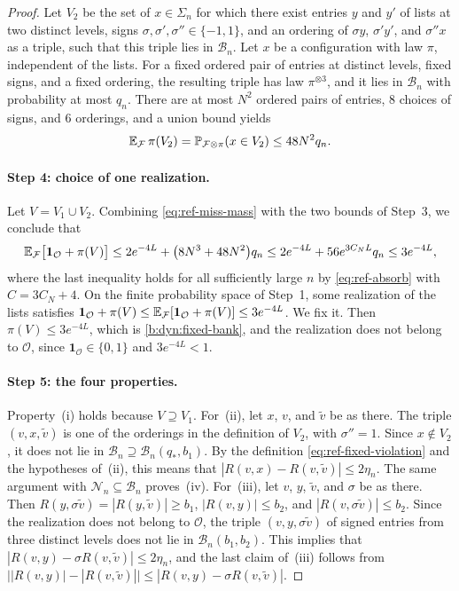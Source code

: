 \begin{proof}
Let $V_2$ be the set of $x\in\Sigma_n$ for which there exist entries
$y$ and $y'$ of lists at two distinct levels, signs $\sigma,\sigma',
\sigma''\in\{-1,1\}$, and an ordering of $\sigma y$, $\sigma'y'$, and
$\sigma''x$ as a triple, such that this triple lies in $\mathcal B_n$. Let
$x$ be a configuration with law $\pi$, independent of the lists. For a fixed
ordered pair of entries at distinct levels, fixed signs, and a fixed
ordering, the resulting triple has law $\pi^{\otimes3}$, and it lies in
$\mathcal B_n$ with probability at most $q_n$. There are at most $N^2$
ordered pairs of entries, $8$ choices of signs, and $6$ orderings, and a
union bound yields
\[
 \mathbb E_{\mathcal F}\,\pi(V_2)
 =\mathbb P_{\mathcal F\otimes\pi}(x\in V_2)\le48N^2q_n .
\]

\paragraph{Step 4: choice of one realization.}
Let $V=V_1\cup V_2$. Combining \eqref{eq:ref-miss-mass} with
the two bounds of Step~3, we conclude that
\[
 \mathbb E_{\mathcal F}\bigl[\mathbf 1_{\mathcal O}+\pi(V)\bigr]
 \le2e^{-4L}+\bigl(8N^3+48N^2\bigr)q_n
 \le2e^{-4L}+56e^{3C_NL}q_n\le3e^{-4L},
\]
where the last inequality holds for all sufficiently large $n$ by
\eqref{eq:ref-absorb} with $C=3C_N+4$. On the finite probability space of
Step~1, some realization of the lists satisfies
$\mathbf 1_{\mathcal O}+\pi(V)\le\mathbb E_{\mathcal F}[\mathbf 1_{\mathcal O}+\pi(V)]\le3e^{-4L}$.
We fix it. Then $\pi(V)\le3e^{-4L}$, which is \eqref{b:dyn:fixed-bank}, and
the realization does not belong to $\mathcal O$, since
$\mathbf 1_{\mathcal O}\in\{0,1\}$ and $3e^{-4L}<1$.

\paragraph{Step 5: the four properties.}
Property~(i) holds because $V\supseteq V_1$. For~(ii), let $x$, $v$,
and ${\widetilde v}$ be as there. The triple $(v,x,{\widetilde v})$ is one of the orderings in the
definition of $V_2$, with $\sigma''=1$. Since $x\notin V_2$,
it does not lie in $\mathcal B_n\supseteq\mathcal B_n(q_*,b_1)$. By the
definition \eqref{eq:ref-fixed-violation} and the hypotheses of~(ii), this
means that $|R(v,x)-R(v,{\widetilde v})|\le2\eta_n$. The same argument with
$\mathcal N_n\subseteq\mathcal B_n$ proves~(iv). For~(iii), let $v$, $y$,
${\widetilde v}$, and $\sigma$ be as there. Then $R(y,\sigma {\widetilde v})=|R(y,{\widetilde v})|\ge b_1$,
$|R(v,y)|\le b_2$, and $|R(v,\sigma {\widetilde v})|\le b_2$. Since the realization does not belong to $\mathcal O$, the triple
$(v,y,\sigma {\widetilde v})$ of signed entries from three distinct levels does not lie in
$\mathcal B_n(b_1,b_2)$. This implies that
$|R(v,y)-\sigma R(v,{\widetilde v})|\le2\eta_n$, and the last claim of~(iii) follows from
$\bigl||R(v,y)|-|R(v,{\widetilde v})|\bigr|\le|R(v,y)-\sigma R(v,{\widetilde v})|$.


\end{proof}
